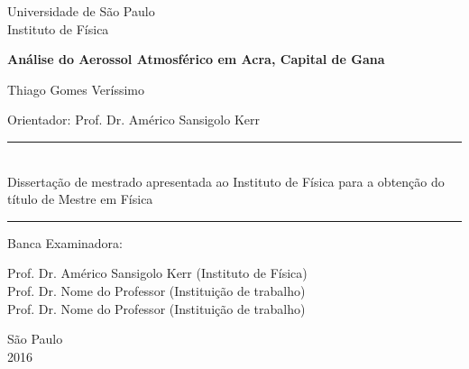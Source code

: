 \begin{titlepage}
\setlength{\voffset}{0pt}
\setlength{\hoffset}{0pt}
\centering
\Large{Universidade de São Paulo \\
Instituto de Física}


\LARGE{\bf Análise do Aerossol Atmosférico em Acra, Capital de Gana
}


\Large{ Thiago Gomes Veríssimo
}


\begin{flushright}

\begin{minipage}{.6\textwidth}
\large{Orientador: Prof. Dr. Américo Sansigolo Kerr
}
\end{minipage}


\begin{minipage}{.6\textwidth}
\rule{\linewidth}{0.5mm}\\
\large{
Dissertação de mestrado apresentada ao Instituto de Física para a obtenção do 
título de Mestre em Física
}

\rule{\linewidth}{0.5mm}
\end{minipage}
\end{flushright}


\begin{flushleft}

\normalsize
Banca Examinadora:\\
\hspace{.03\textwidth}\begin{minipage}{.97\textwidth}
Prof. Dr. Américo Sansigolo Kerr (Instituto de Física) \\
Prof. Dr. Nome do Professor (Instituição de trabalho) \\
Prof. Dr. Nome do Professor (Instituição de trabalho) \\
\end{minipage}
\end{flushleft}


São Paulo\\
2016

\end{titlepage}

